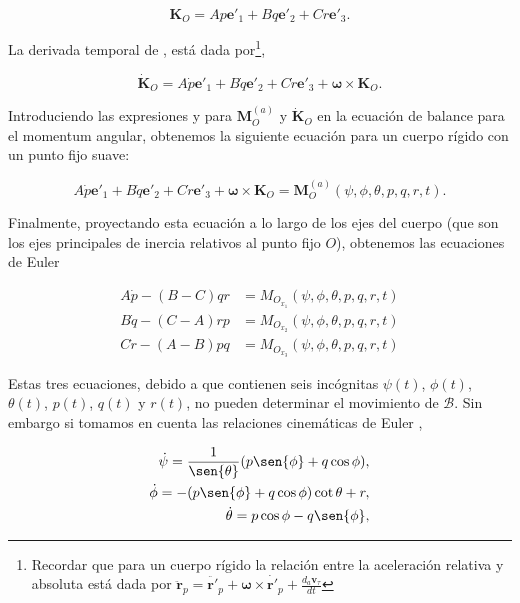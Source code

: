 \documentclass[a4paper,10pt]{article}
\numberwithin{equation}{section}
\begin{document}
\begin{equation}
 \mathbf{K}_O = Ap\mathbf{e'}_1 +  Bq\mathbf{e'}_2 +  Cr\mathbf{e'}_3.
 \label{eq:poinsot4}
\end{equation}

La derivada temporal de , está dada por\footnote{Recordar que 
para un cuerpo rígido la relación entre la aceleración relativa y absoluta está dada 
por $\mathbf{\ddot{r}}_p = \mathbf{\ddot{r'}}_p + \mathbf{\omega} \times \mathbf{\dot{r'}}_p + 
\frac{d_a \mathbf{v}_\tau}{dt}$},  

\begin{equation}
  \dot{\mathbf{K}}_O = A\dot{p}\mathbf{e'}_1 +  B\dot{q}\mathbf{e'}_2 +  C\dot{r}\mathbf{e'}_3
  + \mathbf{\omega}\times \mathbf{K}_O.
  \label{eq:poinsot5}
\end{equation}

Introduciendo las expresiones  y  para $ \mathbf{M}_O^{(a)}$
y $\dot{\mathbf{K}}_O$ en la ecuación de balance para el momentum angular, obtenemos 
la siguiente ecuación para un cuerpo rígido con un punto fijo suave:

\begin{equation}
  A\dot{p}\mathbf{e'}_1 +  B\dot{q}\mathbf{e'}_2 +  C\dot{r}\mathbf{e'}_3
  + \mathbf{\omega}\times \mathbf{K}_O = \mathbf{M}_O^{(a)}(\psi,\phi,\theta,p,q,r,t).
  \label{eq:poinsot6}
\end{equation}

Finalmente, proyectando esta ecuación a lo largo de los ejes del cuerpo (que son los ejes 
principales de inercia relativos al punto fijo $O$), obtenemos las ecuaciones de 
Euler

\begin{align}
  \label{eq:poinsot7}
 A \dot{p} - (B - C)qr &= M_{O_{x{_1}}}(\psi,\phi,\theta,p,q,r,t) \\
   \label{eq:poinsot8}
 B \dot{q} - (C - A)rp &= M_{O_{x{_2}}}(\psi,\phi,\theta,p,q,r,t) \\
   \label{eq:poinsot9}
 C \dot{r} - (A - B)pq &= M_{O_{x{_3}}}(\psi,\phi,\theta,p,q,r,t) 
\end{align}

Estas tres ecuaciones, debido a que contienen seis incógnitas $\psi(t)$, $\phi(t)$, 
$\theta(t)$, $p(t)$, $q(t)$ y $r(t)$, no pueden determinar el movimiento de $\mathcal{B}$.
Sin embargo si tomamos en cuenta las relaciones cinemáticas de Euler \cite{romano, saletan},

\begin{align}
  \label{eq:poinsot10}
 \dot{\psi} = \frac{1}{\sen{\theta}}(p \sen{\phi} + q \cos{\phi}), \\
   \label{eq:poinsot11}
 \dot{\phi} = -(p \sen{\phi} + q \cos{\phi}) \cot{\theta} + r, \\
   \label{eq:poinsot12}
 \dot{\theta} = p \cos{\phi} - q \sen{\phi},
\end{align}
\end{document}
